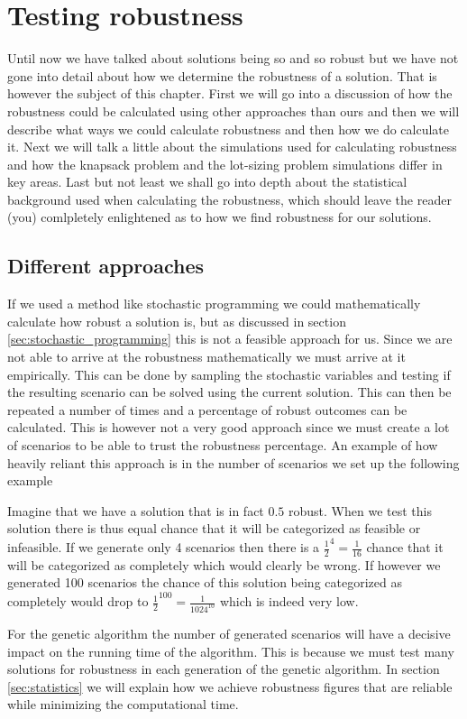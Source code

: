 \chapter{Testing robustness}
\label{sec:testing_robustness}

Until now we have talked about solutions being so and so robust but we
have not gone into detail about how we determine the robustness of a
solution. That is however the subject of this chapter. First we will
go into a discussion of how the robustness could be calculated using
other approaches than ours and then we will describe what ways we
could calculate robustness and then how we do calculate it.  Next we
will talk a little about the simulations used for calculating
robustness and how the knapsack problem and the lot-sizing problem
simulations differ in key areas.  Last but not least we shall go into
depth about the statistical background used when calculating the
robustness, which should leave the reader (you) comlpletely
enlightened as to how we find robustness for our solutions.

\section{Different approaches}
\label{sec:different_approaches}
If we used a method like stochastic programming we could
mathematically calculate how robust a solution is, but as discussed in
section \ref{sec:stochastic_programming} this is not a feasible
approach for us. Since we are not able to arrive at the robustness
mathematically we must arrive at it empirically. This can be done by
sampling the stochastic variables and testing if the resulting
scenario can be solved using the current solution. This can then be
repeated a number of times and a percentage of robust outcomes can be
calculated. This is however not a very good approach since we must
create a lot of scenarios to be able to trust the robustness
percentage. An example of how heavily reliant this approach is in the
number of scenarios we set up the following example
\begin{example}
Imagine that we have a solution that is in fact $0.5$ robust. When we
test this solution there is thus equal chance that it will be
categorized as feasible or infeasible. If we generate only 4 scenarios
then there is a $\frac12^4 = \frac{1}{16}$ chance that it will be
categorized as completely which would clearly be wrong. If however
we generated 100 scenarios the chance of this solution being
categorized as completely would drop to $\frac12^{100} =
\frac1{1024^{10}}$ which is indeed very low.
\end{example}
For the genetic algorithm the number of generated scenarios will have
a decisive impact on the running time of the algorithm. This is
because we must test many solutions for robustness in each generation
of the genetic algorithm. In section \ref{sec:statistics} we will
explain how we achieve robustness figures that are reliable while
minimizing the computational time.

